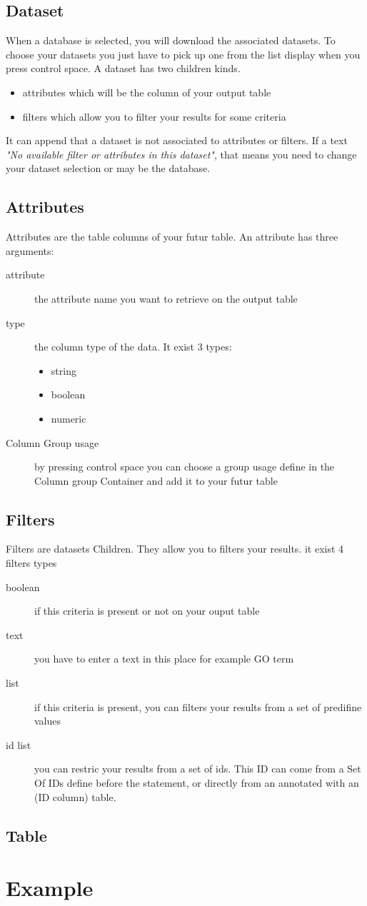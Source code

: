 \subsection{Dataset}
When a database  is selected, you will download the associated datasets. To choose your datasets you just have to pick up one from the list display when you press control space.
A dataset has two children kinds.
\begin{itemize}
\item attributes which will be the column of your output table
\item filters which allow you to filter your results for some criteria
\end{itemize}
It can append that a dataset is not associated to attributes or filters. If a text \textit{"No available filter or attributes in this dataset"}, that means you need to change your dataset selection or may be the database. 

\subsection{Attributes}
Attributes are the table columns of your futur table. An attribute has three arguments:
\begin{description}
\item [attribute] the attribute name you want to retrieve on the output table
\item [type] the column type of the data. It exist 3 types:
\begin{itemize}
\item string 
\item boolean 
\item numeric
\end{itemize}

\item [Column Group usage] by pressing control space you can choose a group usage define in the Column group Container and add it to your futur table
\end{description}

\subsection{Filters}
Filters are datasets Children. They allow you to filters your results. it exist 4 filters types
\begin{description}
\item[boolean] if this criteria is present or not on your ouput table
\item[text] you have to enter a text in this place for example GO term
\item[list] if this criteria is present, you can filters your results from a set of predifine values
\item[id list] you can restric your results from a set of ids. This ID can come from a Set Of IDs define before the statement, or directly from an annotated with an (ID column) table.  
\end{description}
\subsection{Table}

\section{Example}
